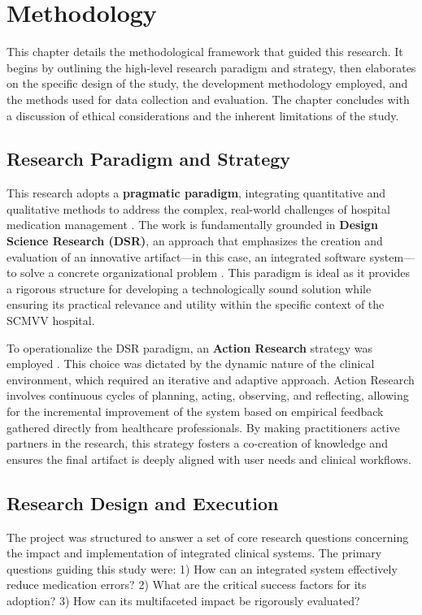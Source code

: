 \chapter{Methodology}
\label{chap:Methodology}

This chapter details the methodological framework that guided this research. It begins by outlining the high-level research paradigm and strategy, then elaborates on the specific design of the study, the development methodology employed, and the methods used for data collection and evaluation. The chapter concludes with a discussion of ethical considerations and the inherent limitations of the study.

\section{Research Paradigm and Strategy}

This research adopts a \textbf{pragmatic paradigm}, integrating quantitative and qualitative methods to address the complex, real-world challenges of hospital medication management \cite{venkatesh2003}. The work is fundamentally grounded in \textbf{Design Science Research (DSR)}, an approach that emphasizes the creation and evaluation of an innovative artifact—in this case, an integrated software system—to solve a concrete organizational problem \cite{martin2017}. This paradigm is ideal as it provides a rigorous structure for developing a technologically sound solution while ensuring its practical relevance and utility within the specific context of the SCMVV hospital.

To operationalize the DSR paradigm, an \textbf{Action Research} strategy was employed \cite{greenhalgh2017}. This choice was dictated by the dynamic nature of the clinical environment, which required an iterative and adaptive approach. Action Research involves continuous cycles of planning, acting, observing, and reflecting, allowing for the incremental improvement of the system based on empirical feedback gathered directly from healthcare professionals. By making practitioners active partners in the research, this strategy fosters a co-creation of knowledge and ensures the final artifact is deeply aligned with user needs and clinical workflows.

\section{Research Design and Execution}

The project was structured to answer a set of core research questions concerning the impact and implementation of integrated clinical systems. The primary questions guiding this study were: 1) How can an integrated system effectively reduce medication errors? 2) What are the critical success factors for its adoption? 3) How can its multifaceted impact be rigorously evaluated?

